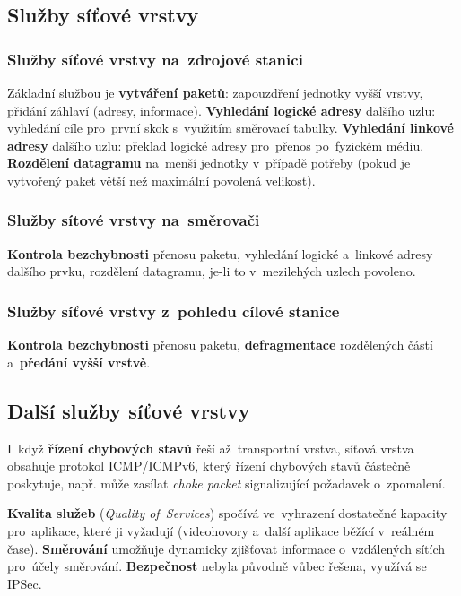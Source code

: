 \subsection{Služby síťové vrstvy}

\subsubsection{Služby síťové vrstvy na~zdrojové stanici}

Základní službou je \textbf{vytváření paketů}: zapouzdření jednotky vyšší vrstvy, přidání záhlaví (adresy, informace). \textbf{Vyhledání logické adresy} dalšího uzlu: vyhledání cíle pro~první skok s~využitím směrovací tabulky. \textbf{Vyhledání linkové adresy} dalšího uzlu: překlad logické adresy pro~přenos po~fyzickém médiu. \textbf{Rozdělení datagramu} na~menší jednotky v~případě potřeby (pokud je vytvořený paket větší než maximální povolená velikost).

\subsubsection{Služby sítové vrstvy na~směrovači}

\textbf{Kontrola bezchybnosti} přenosu paketu, vyhledání logické a~linkové adresy dalšího prvku, rozdělení datagramu, je-li to v~mezilehých uzlech povoleno.

\subsubsection{Služby síťové vrstvy z~pohledu cílové stanice}

\textbf{Kontrola bezchybnosti} přenosu paketu, \textbf{defragmentace} rozdělených částí a~\textbf{předání vyšší vrstvě}.

\subsection{Další služby síťové vrstvy}

I~když \textbf{řízení chybových stavů} řeší až~transportní vrstva, síťová vrstva obsahuje protokol ICMP/ICMPv6, který řízení chybových stavů částečně poskytuje, např. může zasílat \emph{choke packet} signalizující požadavek o~zpomalení.

\textbf{Kvalita služeb} (\emph{Quality of~Services}) spočívá ve~vyhrazení dostatečné kapacity pro~aplikace, které ji vyžadují (videohovory a~další aplikace běžící v~reálném čase). \textbf{Směrování} umožňuje dynamicky zjišťovat informace o~vzdálených sítích pro~účely směrování. \textbf{Bezpečnost} nebyla původně vůbec řešena, využívá se IPSec.

